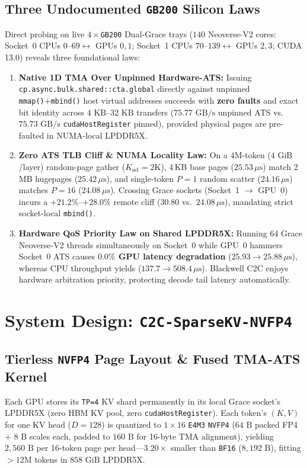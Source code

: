\documentclass[conference,10pt]{IEEEtran}
\begin{document}
\subsection{Three Undocumented \texttt{GB200} Silicon Laws}
Direct probing on live $4\times$\texttt{GB200} Dual-Grace trays ($140$ Neoverse-V2 cores: Socket~0 CPUs $0$--$69 \leftrightarrow$ GPUs $0,1$; Socket~1 CPUs $70$--$139 \leftrightarrow$ GPUs $2,3$; CUDA 13.0) reveals three foundational laws:
\begin{enumerate}
    \item \textbf{Native 1D TMA Over Unpinned Hardware-ATS:} Issuing \texttt{cp.async.bulk.shared::cta.global} directly against unpinned \texttt{mmap()}+\texttt{mbind()} host virtual addresses succeeds with \textbf{zero faults} and exact bit identity across $4\text{ KB}$--$32\text{ KB}$ transfers ($75.77\text{ GB/s}$ unpinned ATS vs.\ $75.73\text{ GB/s}$ \texttt{cudaHostRegister} pinned), provided physical pages are pre-faulted in NUMA-local LPDDR5X.
    \item \textbf{Zero ATS TLB Cliff \& NUMA Locality Law:} On a $4\text{M}$-token ($4\text{ GiB}$/layer) random-page gather ($K_{\text{sel}}{=}2\text{K}$), 4\,KB base pages ($25.53\,\mu\text{s}$) match 2\,MB hugepages ($25.42\,\mu\text{s}$), and single-token $P{=}1$ random scatter ($24.16\,\mu\text{s}$) matches $P{=}16$ ($24.08\,\mu\text{s}$). Crossing Grace sockets (Socket~1 $\to$ GPU~0) incurs a $+21.2\%$--$+28.0\%$ remote cliff ($30.80$ vs.\ $24.08\,\mu\text{s}$), mandating strict socket-local \texttt{mbind()}.
    \item \textbf{Hardware QoS Priority Law on Shared LPDDR5X:} Running $64$ Grace Neoverse-V2 threads simultaneously on Socket~0 while GPU~0 hammers Socket~0 ATS causes \textbf{$0.0\%$ GPU latency degradation} ($25.93 \to 25.88\,\mu\text{s}$), whereas CPU throughput yields ($137.7 \to 508.4\,\mu\text{s}$). Blackwell C2C enjoys hardware arbitration priority, protecting decode tail latency automatically.
\end{enumerate}

\section{System Design: \texttt{C2C-SparseKV-NVFP4}}

\subsection{Tierless \texttt{NVFP4} Page Layout \& Fused TMA-ATS Kernel}
Each GPU stores its \texttt{TP=4} KV shard permanently in its local Grace socket's LPDDR5X (zero HBM KV pool, zero \texttt{cudaHostRegister}). Each token's $(K, V)$ for one KV head ($D{=}128$) is quantized to $1{\times}16$ \texttt{E4M3} \texttt{NVFP4} ($64\text{ B}$ packed FP4 + $8\text{ B}$ scales each, padded to $160\text{ B}$ for 16-byte TMA alignment), yielding \textbf{$2{,}560\text{ B}$} per 16-token page per head---$3.20\times$ smaller than \texttt{BF16} ($8{,}192\text{ B}$), fitting $>12\text{M}$ tokens in $858\text{ GiB}$ LPDDR5X.
\end{document}
